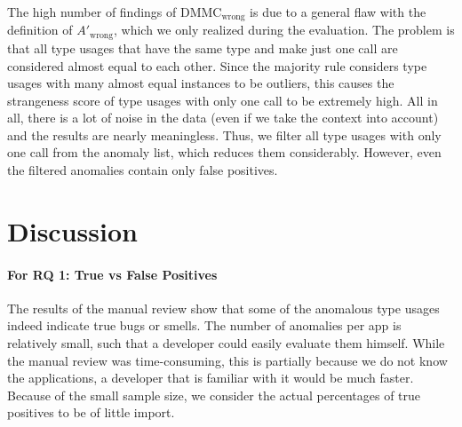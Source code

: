 The high number of findings of $\text{DMMC}_\text{wrong}$ is due to a general flaw with the definition of $A'_\text{wrong}$, which we only realized during the evaluation.
The problem is that all type usages that have the same type and make just one call are considered almost equal to each other.
Since the majority rule considers type usages with many almost equal instances to be outliers, this causes the strangeness score of type usages with only one call to be extremely high.
All in all, there is a lot of noise in the data (even if we take the context into account) and the results are nearly meaningless.
Thus, we filter all type usages with only one call from the anomaly list, which reduces them considerably.
However, even the filtered anomalies contain only false positives.

\section{Discussion}

\paragraph{For RQ 1: True vs False Positives}

The results of the manual review show that some of the anomalous type usages indeed indicate true bugs or smells.
The number of anomalies per app is relatively small, such that a developer could easily evaluate them himself.
While the manual review was time-consuming, this is partially because we do not know the applications, a developer that is familiar with it would be much faster.
Because of the small sample size, we consider the actual percentages of true positives to be of little import.

